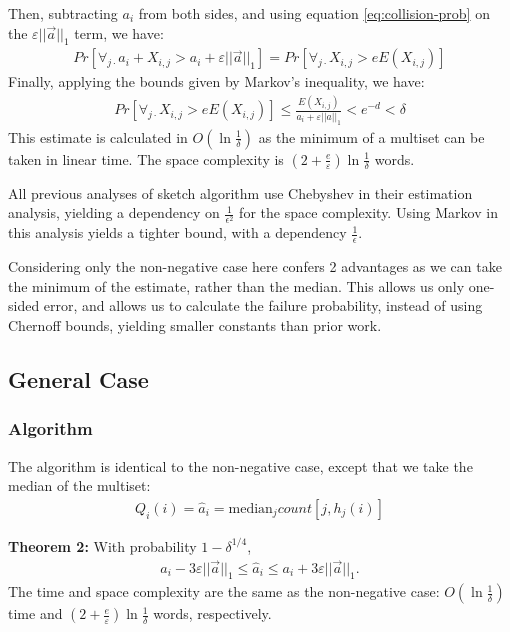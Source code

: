 \documentclass[11pt]{article}
\newcommand{\sq}{\mathit{Q}_i}
\begin{document}
Then, subtracting $a_i$ from both sides, and using equation \ref{eq:collision-prob} on the $\varepsilon ||\vec{a}||_1$ term, we have:
\begin{align}
    Pr[\forall_{j \cdot} a_i + X_{i, j} > a_i + \varepsilon ||\vec{a}||_1]  = Pr[\forall_{j \cdot} X_{i, j} > e E(X_{i, j})]
\end{align}
Finally, applying the bounds given by Markov's inequality, we have:
\begin{align}
      Pr[\forall_{j \cdot} X_{i, j} > e E(X_{i, j})] \leq \frac{E(X_{i, j})}{a_i + \varepsilon||a||_1} < e^{-d} < \delta
\end{align}
This estimate is calculated in $O(\ln \frac{1}{\delta})$ as the minimum of a multiset can be taken in linear time.
The space complexity is $(2 + \frac{e}{\varepsilon})\ln \frac{1}{\delta}$ words.

All previous analyses of sketch algorithm use Chebyshev in their estimation analysis, yielding a dependency on
$\frac{1}{\epsilon^2}$ for the space complexity.  Using Markov in this analysis yields a tighter bound,
with a dependency $\frac{1}{\epsilon}$.

Considering only the non-negative case here confers 2 advantages as we can take the minimum of the estimate,
rather than the median.  This allows us only one-sided error, and allows us to calculate the failure
probability, instead of using Chernoff bounds, yielding smaller constants than prior work.

\subsection{General Case}
\subsubsection{Algorithm}
The algorithm is identical to the non-negative case, except that we take the median of the multiset:
\begin{align}
    \sq(i) = \hat{a}_i = \text{median}_j count[j, h_j(i)]
\end{align}

\textbf{Theorem 2:} With probability $1 - \delta^{1/4}$,
\begin{align}
    a_i - 3\varepsilon||\vec{a}||_1 \leq \hat{a}_i \leq a_i + 3\varepsilon||\vec{a}||_1. 
\end{align}
The time and space complexity are the same as the non-negative case: $O(\ln
\frac{1}{\delta})$ time and $(2 + \frac{e}{\varepsilon})\ln \frac{1}{\delta}$
words, respectively.
\end{document}
